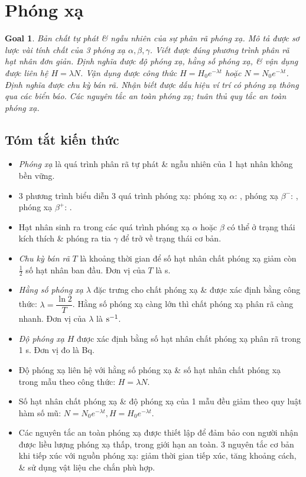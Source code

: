 \documentclass{article}
\newtheorem{goal}{Goal}
\begin{document}

\section{Phóng xạ}

\begin{goal}
	Bản chất tự phát \& ngẫu nhiên của sự phân rã phóng xạ. Mô tả được sơ lược vài tính chất của 3 phóng xạ $\alpha,\beta,\gamma$. Viết được đúng phương trình phân rã hạt nhân đơn giản. Định nghĩa được độ phóng xạ, hằng số phóng xạ, \& vận dụng được liên hệ $H = \lambda N$. Vận dụng được công thức $H = H_0e^{-\lambda t}$ hoặc $N = N_0e^{-\lambda t}$. Định nghĩa được chu kỳ bán rã. Nhận biết được dấu hiệu ví trí có phóng xạ thông qua các biển báo. Các nguyên tắc an toàn phóng xạ; tuân thủ quy tắc an toàn phóng xạ.
\end{goal}

\subsection{Tóm tắt kiến thức}

\begin{itemize}
	\item {\it Phóng xạ} là quá trình phân rã tự phát \& ngẫu nhiên của 1 hạt nhân không bền vững.
	\item 3 phương trình biểu diễn 3 quá trình phóng xạ: phóng xạ $\alpha$: , phóng xạ $\beta^-$: , phóng xạ $\beta^+$: .
	\item Hạt nhân sinh ra trong các quá trình phóng xạ $\alpha$ hoặc $\beta$ có thể ở trạng thái kích thích \& phóng ra tia $\gamma$ để trở về trạng thái cơ bản.
	\item {\it Chu kỳ bán rã} $T$ là khoảng thời gian để số hạt nhân chất phóng xạ giảm còn $\frac{1}{2}$ số hạt nhân ban đầu. Đơn vị của $T$ là s.
	\item {\it Hằng số phóng xạ} $\lambda$ đặc trưng cho chất phóng xạ \& được xác định bằng công thức: $\lambda = \dfrac{\ln2}{T}$. Hằng số phóng xạ càng lớn thì chất phóng xạ phân rã càng nhanh. Đơn vị của $\lambda$ là $\rm s^{-1}$.
	\item {\it Độ phóng xạ} $H$ được xác định bằng số hạt nhân chất phóng xạ phân rã trong 1 s. Đơn vị đo là Bq.
	\item Độ phóng xạ liên hệ với hằng số phóng xạ \& số hạt nhân chất phóng xạ trong mẫu theo công thức: $H = \lambda N$.
	\item Số hạt nhân chất phóng xạ \& độ phóng xạ của 1 mẫu đều giảm theo quy luật hàm số mũ: $N = N_0e^{-\lambda t},H = H_0e^{-\lambda t}$.
	\item Các nguyên tắc an toàn phóng xạ được thiết lập để đảm bảo con người nhận được liều lượng phóng xạ thấp, trong giới hạn an toàn. 3 nguyên tắc cơ bản khi tiếp xúc với nguồn phóng xạ: giảm thời gian tiếp xúc, tăng khoảng cách, \& sử dụng vật liệu che chắn phù hợp.
\end{itemize}
\end{document}
